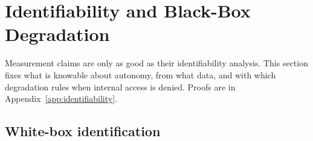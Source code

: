 \section{Identifiability and Black-Box Degradation}\label{sec:identifiability}

Measurement claims are only as good as their identifiability analysis. This
section fixes what is knowable about autonomy, from what data, and with which
degradation rules when internal access is denied. Proofs are in
Appendix~\ref{app:identifiability}.

\subsection{White-box identification}

